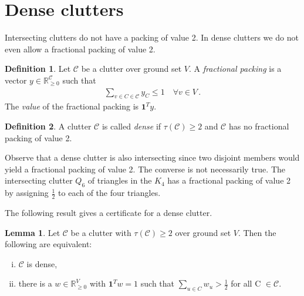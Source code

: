 \documentclass[a4paper, 12pt]{scrbook}
\theoremstyle{definition}
\newtheorem*{definition}{Definition}
\newtheorem{lemma}[theorem]{Lemma}
\newcommand*{\IR}{\ensuremath{\mathbb{R}}}
\begin{document}
\section{Dense clutters}
Intersecting clutters do not have a packing of value 2. In dense clutters we do not even allow a fractional packing of value 2.
\begin{definition}
    Let $\mathcal{C}$ be a clutter over ground set $V$.
    A \emph{fractional packing} is a vector $y \in \IR_{\geq0}^{\mathcal{C}}$ such that
    \begin{align*}
        \sum_{v \in C \in \mathcal{C}} y_C \leq 1 \quad \forall v \in V \,.
    \end{align*}
    The \emph{value} of the fractional packing is $\textbf{1}^Ty$.
\end{definition}
\begin{definition}
    A clutter $\mathcal{C}$ is called \emph{dense} if $\tau(\mathcal{C}) \geq 2$ and $\mathcal{C}$ has no fractional packing of value 2.
\end{definition}

Observe that a dense clutter is also intersecting since two disjoint members would yield a fractional packing of value 2.
The converse is not necessarily true.
The intersecting clutter $Q_6$ of triangles in the $K_4$ has a fractional packing of value 2 by assigning $\frac 12$ to each of the four triangles.

The following result gives a certificate for a dense clutter.
\begin{lemma}\label{certificate}
    Let $\mathcal{C}$ be a clutter with $\tau(\mathcal{C})\geq 2$ over ground set $V$.
    Then the following are equivalent:
    \leavevmode
    \begin{enumerate}[(i)]
        \item $\mathcal{C}$ is dense,
        \item there is a $w \in \IR_{\geq 0}^V$ with $\textbf{1}^Tw=1$ such that $\sum_{u \in C} w_u > \frac 12$ for all C $\in \mathcal{C}$.
    \end{enumerate}
\end{lemma}
\end{document}

